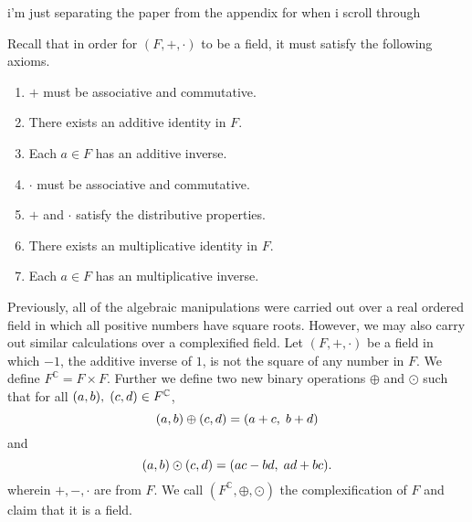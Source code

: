 \documentclass[12pt]{article}
\newcommand{\C}{\mathbb{C}}
\newcommand{\ttc}{, \hspace{1mm}}
\theoremstyle{plain}
\theoremstyle{definition}
\begin{document}
\newpage 
i'm just separating the paper from the appendix for when i scroll through


\newpage 

Recall that in order for $(F,+,\cdot)$ to be a field, it must satisfy the following axioms.
\begin{enumerate}
	\item $+$ must be associative and commutative.
	\item There exists an additive identity in $F$.
	\item Each $a\in F$ has an additive inverse.
	\item $\cdot$ must be associative and commutative.
	\item $+$ and $\cdot$ satisfy the distributive properties.
	\item There exists an multiplicative identity in $F$.
	\item Each $a\in F$ has an multiplicative inverse.
\end{enumerate}
Previously, all of the algebraic manipulations were carried out over a real ordered field in which all positive numbers have square roots. However, we may also carry out similar calculations over a complexified field. Let $(F,+,\cdot)$ be a field in which $-1$, the additive inverse of $1$, is not the square of any number in $F$. We define $F^\C = F\times F$. Further we define two new binary operations $\oplus$ and $\odot$ such that for all $(a,b)\ttc (c,d)\in F^\C$,
	\[
		(a,b)\oplus(c,d) = (a + c\ttc b + d)
	\]
and
	\[
		(a,b)\odot(c,d) = (ac - bd\ttc ad + bc).
	\]
wherein $+,-,\cdot$ are from $F$. We call $(F^\C,\oplus,\odot)$ the complexification of $F$ and claim that it is a field. 
\end{document}
